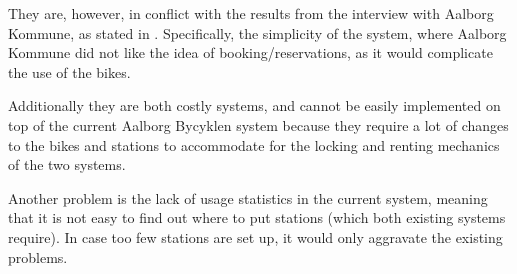 They are, however, in conflict with the results from the interview with Aalborg Kommune, as stated in .
Specifically, the simplicity of the system, where Aalborg Kommune did not like the idea of booking/reservations, as it would complicate the use of the bikes.

Additionally they are both costly systems, and cannot be easily implemented on top of the current Aalborg Bycyklen system because they require a lot of changes to the bikes and stations to accommodate for the locking and renting mechanics of the two systems.

Another problem is the lack of usage statistics in the current system, meaning that it is not easy to find out where to put stations (which both existing systems require).
In case too few stations are set up, it would only aggravate the existing problems.

